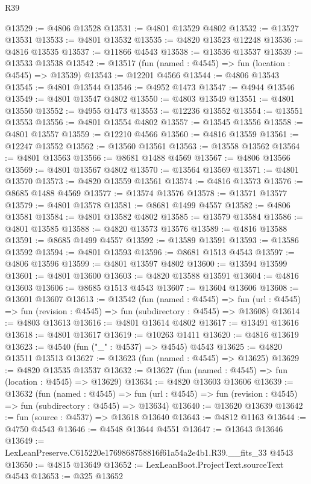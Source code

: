 \begin{lexlean}{R39}
\begin{coremodule}
@13529 := @4806 @13528
@13531 := @4801 @13529 @4802
@13532 := @13527 @13531
@13533 := @4801 @13532
@13535 := @4820 @13523 @12248
@13536 := @4816 @13535
@13537 := @11866 @4543
@13538 := @13536 @13537
@13539 := @13533 @13538
@13542 := @13517 (fun (named : @4545) => fun (location : @4545) => @13539)
@13543 := @12201 @4566
@13544 := @4806 @13543
@13545 := @4801 @13544
@13546 := @4952 @1473
@13547 := @4944 @13546
@13549 := @4801 @13547 @4802
@13550 := @4803 @13549
@13551 := @4801 @13550
@13552 := @4955 @1473
@13553 := @12236 @13552
@13554 := @13551 @13553
@13556 := @4801 @13554 @4802
@13557 := @13545 @13556
@13558 := @4801 @13557
@13559 := @12210 @4566
@13560 := @4816 @13559
@13561 := @12247 @13552
@13562 := @13560 @13561
@13563 := @13558 @13562
@13564 := @4801 @13563
@13566 := @8681 @1488 @4569
@13567 := @4806 @13566
@13569 := @4801 @13567 @4802
@13570 := @13564 @13569
@13571 := @4801 @13570
@13573 := @4820 @13559 @13561
@13574 := @4816 @13573
@13576 := @8685 @1488 @4569
@13577 := @13574 @13576
@13578 := @13571 @13577
@13579 := @4801 @13578
@13581 := @8681 @1499 @4557
@13582 := @4806 @13581
@13584 := @4801 @13582 @4802
@13585 := @13579 @13584
@13586 := @4801 @13585
@13588 := @4820 @13573 @13576
@13589 := @4816 @13588
@13591 := @8685 @1499 @4557
@13592 := @13589 @13591
@13593 := @13586 @13592
@13594 := @4801 @13593
@13596 := @8681 @1513 @4543
@13597 := @4806 @13596
@13599 := @4801 @13597 @4802
@13600 := @13594 @13599
@13601 := @4801 @13600
@13603 := @4820 @13588 @13591
@13604 := @4816 @13603
@13606 := @8685 @1513 @4543
@13607 := @13604 @13606
@13608 := @13601 @13607
@13613 := @13542
    (fun (named : @4545) =>
    fun (url : @4545) => fun (revision : @4545) => fun (subdirectory : @4545) => @13608)
@13614 := @4803 @13613
@13616 := @4801 @13614 @4802
@13617 := @13491 @13616
@13618 := @4801 @13617
@13619 := @10263 @1411
@13620 := @4816 @13619
@13623 := @4540 (fun ("_" : @4537) => @4545) @4543
@13625 := @4820 @13511 @13513
@13627 := @13623 (fun (named : @4545) => @13625)
@13629 := @4820 @13535 @13537
@13632 := @13627 (fun (named : @4545) => fun (location : @4545) => @13629)
@13634 := @4820 @13603 @13606
@13639 := @13632
    (fun (named : @4545) =>
    fun (url : @4545) => fun (revision : @4545) => fun (subdirectory : @4545) => @13634)
@13640 := @13620 @13639
@13642 := fun (source : @4537) => @13618 @13640
@13643 := @4812 @1163
@13644 := @4750 @4543
@13646 := @4548 @13644 @4551
@13647 := @13643 @13646
@13649 := LexLeanPreserve.C615220e1769868758816f61a54a2e4b1.R39.__fits_33 @4543
@13650 := @4815 @13649
@13652 := LexLeanBoot.ProjectText.sourceText @4543
@13653 := @325 @13652

\end{coremodule}
\end{lexlean}
